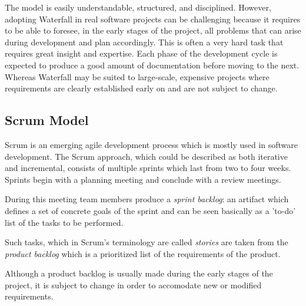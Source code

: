The model is easily understandable, structured, and disciplined.
However, adopting Waterfall in real software projects can be challenging because it requires to be able to foresee,
in the early stages of the project, all problems that can arise during development and plan accordingly.
This is often a very hard task that requires great insight and expertise.
Each phase of the development cycle is expected to produce a good amount of documentation before moving to the next.
Whereas Waterfall may be suited to large-scale, expensive projects where requirements
are clearly established early on and are not subject to change.

\subsection{Scrum Model} \nocite{Compendium}

Scrum is an emerging agile development process which is mostly used in software development.
The Scrum approach, which could be described as both iterative and incremental, consists of multiple sprints
which last from two to four weeks. Sprints begin with a planning meeting and conclude with a review meetings.

During this meeting team members produce a \emph{sprint backlog}: an artifact which defines a set of
concrete goals of the sprint and can be seen basically as a 'to-do' list of the tasks to be performed.

Such tasks, which in Scrum's terminology are called \emph{stories} are taken from the
\emph{product backlog} which is a prioritized list of the requirements of the product.

Although a product backlog is usually made during the early stages of the project, it is subject to
change in order to accomodate new or modified requirements.


